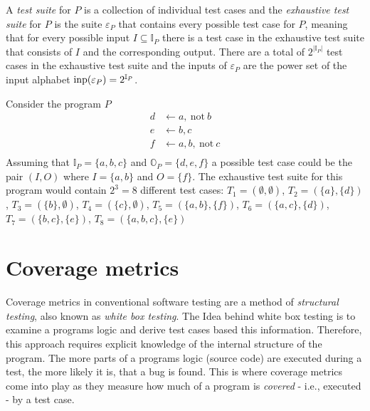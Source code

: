 A \emph{test suite} for $P$ is a collection of individual test cases and the \emph{exhaustive test suite} for $P$ is the suite \(\varepsilon_P\) that contains every possible test case for $P$, meaning that for every possible input \(I \subseteq \mathbb{I}_P\) there is a test case in the exhaustive test suite that consists of $I$ and the corresponding output. There are a total of \(2^{|\mathbb{I}_P|}\) test cases in the exhaustive test suite and the inputs of $\varepsilon_P$ are the power set of the input alphabet \(\operatorname{inp}(\varepsilon_P) = 2^{\mathbb{I}_P}\).

\begin{example}
\label{ex:test suite}
    Consider the program $P$
    \begin{align*}
        d &\leftarrow a,\ \text{not}\ b \\
        e &\leftarrow b, c \\
        f &\leftarrow a, b,\ \text{not}\ c \\
    \end{align*}
    Assuming that \(\mathbb{I}_P = \{a, b, c\}\) and \(\mathbb{O}_P = \{d, e, f\}\) a possible test case could be the pair \((I, O)\) where \(I = \{a, b\}\) and \(O = \{f\}\).
    The exhaustive test suite for this program would contain \(2^3 = 8\) different test cases: \(T_1 = (\emptyset, \emptyset)\), \(T_2 = (\{a\}, \{d\})\), \(T_3 
 = (\{b\}, \emptyset)\), \(T_4 = (\{c\}, \emptyset)\), \(T_5 = (\{a, b\}, \{f\})\), \(T_6 = (\{a, c\}, \{d\})\), \(T_7 = (\{b, c\}, \{e\})\), \(T_8 = (\{a, b, c\}, \{e\})\)
\end{example}

\begin{comment}
- maybe Specification -> the correct (expected) output for every input, what does it mean for a program to "pass/be compliant 
with" a testcase, when is a program "correct" with respect to a specification (not actually needed for coverage as coverage 
does not care about specification!)    
\end{comment}


\chapter{Coverage metrics}
\label{ch:Coverage metrics}
Coverage metrics in conventional software testing are a method of \emph{structural testing}, also known as \emph{white box testing}. The Idea behind white box testing is to examine a programs logic and derive test cases based this information. Therefore, this approach requires explicit knowledge of the internal structure of the program. The more parts of a programs logic (source code) are executed during a test, the more likely it is, that a bug is found. This is where coverage metrics come into play as they measure how much of a program is \emph{covered} - i.e., executed - by a test case.

